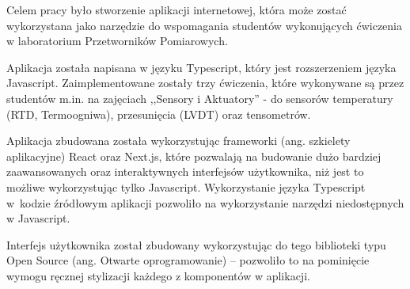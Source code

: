 Celem pracy było stworzenie aplikacji internetowej, która może zostać
wykorzystana jako narzędzie do wspomagania studentów wykonujących ćwiczenia w laboratorium
Przetworników Pomiarowych.

Aplikacja została napisana w języku Typescript, który jest
rozszerzeniem języka Javascript.  Zaimplementowane zostały trzy ćwiczenia, które wykonywane są
przez studentów m.in. na zajęciach ,,Sensory i Aktuatory'' - do sensorów temperatury (RTD,
Termoogniwa), przesunięcia (LVDT) oraz tensometrów.

Aplikacja zbudowana została wykorzystując frameworki (ang. szkielety aplikacyjne) React oraz
Next.js, które pozwalają na budowanie dużo bardziej zaawansowanych oraz interaktywnych interfejsów
użytkownika, niż jest to możliwe wykorzystując tylko Javascript. Wykorzystanie języka Typescript
w~kodzie źródłowym aplikacji pozwoliło na wykorzystanie narzędzi niedostępnych w Javascript.

Interfejs użytkownika został zbudowany wykorzystując do tego biblioteki typu Open Source
(ang. Otwarte oprogramowanie) -- pozwoliło to na pominięcie wymogu ręcznej stylizacji każdego z
komponentów w aplikacji.